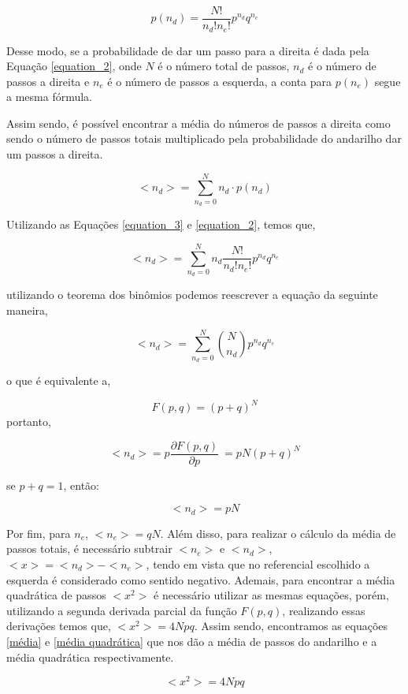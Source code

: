 \begin{equation} \label{equation_2}
    p(n_d) = \frac{N!}{n_d! n_e!} p^{n_d} q^{n_e}
\end{equation}

Desse modo, se a probabilidade de dar um passo para a direita é dada pela Equação \ref{equation_2}, onde $N$ é o número total de passos, $n_d$ é o número de passos a direita e $n_e$ é o número de passos a esquerda, a conta para $p(n_e)$ segue a mesma fórmula.

Assim sendo, é possível encontrar a média do números de passos a direita como sendo o número de passos totais multiplicado pela probabilidade do andarilho dar um passos a direita.

\begin{equation}\label{equation_3}
    <n_d> = \sum_{n_d=0}^{N} n_d \cdot p(n_d)
\end{equation}

\noindent Utilizando as Equações \ref{equation_3} e \ref{equation_2}, temos que,

\[     <n_d> = \sum_{n_d=0}^{N} n_d \frac{N!}{n_d! n_e!} p^{n_d} q^{n_e}  \]

\noindent utilizando o teorema dos binômios podemos reescrever a equação da seguinte maneira,

\[ <n_d> = \sum_{n_d=0}^{N} \binom{N}{n_d} p^{n_d} q^{n_e}\]

\noindent o que é equivalente a,

\[ F(p,q) = (p + q)^N\]
\noindent portanto,

\[ <n_d> = p \frac{\partial F(p,q)}{\partial p}\ = p N (p+q)^N \]

\noindent se $p + q = 1$, então:

\[ <n_d> = pN\]

Por fim, para $n_e$, $<n_e> = qN$. Além disso, para realizar o cálculo da média de passos totais, é necessário subtrair $<n_e>$ e $<n_d>$, \(<x> = <n_d> - <n_e>\), tendo em vista que no referencial escolhido a esquerda é considerado como sentido negativo. Ademais, para encontrar a média quadrática de passos $<x^2>$ é necessário utilizar as mesmas equações, porém, utilizando a segunda derivada parcial da função $F(p,q)$, realizando essas derivações temos que, \( <x^2> = 4 N p q\). Assim sendo, encontramos as equações \ref{média} e \ref{média quadrática} que nos dão a média de passos do andarilho e a média quadrática respectivamente.

\begin{equation} \label{média quadrática}
    <x^2> = 4 N p q
\end{equation}

